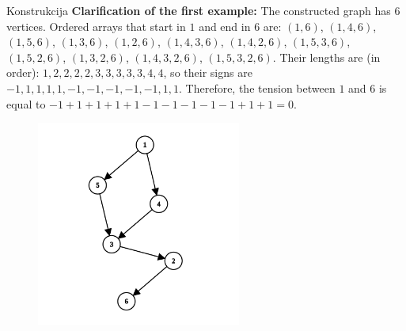 \begin{statement}[
  problempoints=110,
  timelimit=1 sekunda,
  memorylimit=512 MiB,
]{Konstrukcija}
\textbf{Clarification of the first example:}
The constructed graph has $6$ vertices. Ordered arrays that start in $1$ and
end in $6$ are: $(1, 6)$, $(1, 4, 6)$, $(1, 5, 6)$, $(1, 3, 6)$, $(1, 2, 6)$,
$(1, 4, 3, 6)$, $(1, 4, 2, 6)$, $(1, 5, 3, 6)$, $(1, 5, 2, 6)$, $(1, 3, 2, 6)$,
$(1, 4, 3, 2, 6)$, $(1, 5, 3, 2, 6)$. Their lengths are (in order): $1, 2, 2,
2, 2, 3, 3, 3, 3, 3, 4, 4$, so their signs are $-1, 1, 1, 1, 1, -1, -1, -1, -1,
-1, 1, 1$. Therefore, the tension between $1$ and $6$ is equal to $-1 + 1 + 1 +
1 + 1 - 1 - 1 - 1 - 1 - 1 + 1 + 1 = 0$.

\setlength\intextsep{-0.5cm}
\begin{figure}
\centering
\includegraphics[width=0.6\textwidth]{graph.png}
\end{figure}

\end{statement}

